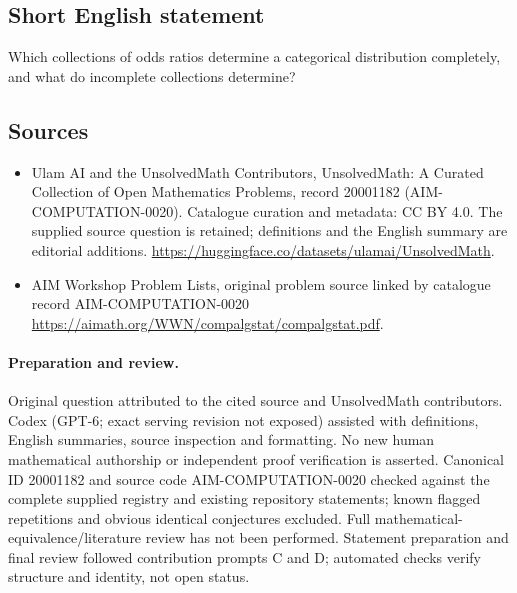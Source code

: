\documentclass[11pt]{article}
\begin{document}
\subsection{Short English statement}
Which collections of odds ratios determine a categorical distribution completely, and what do incomplete collections determine?
\subsection{Sources}
\begin{itemize}
\item[\hypertarget{source:20001182:1}{S1}] Ulam AI and the UnsolvedMath Contributors, UnsolvedMath: A Curated Collection of Open Mathematics Problems, record 20001182 (AIM-COMPUTATION-0020). Catalogue curation and metadata: CC BY 4.0. The supplied source question is retained; definitions and the English summary are editorial additions.
\url{https://huggingface.co/datasets/ulamai/UnsolvedMath}.
\item[\hypertarget{source:20001182:2}{S2}] AIM Workshop Problem Lists, original problem source linked by catalogue record AIM-COMPUTATION-0020
\url{https://aimath.org/WWN/compalgstat/compalgstat.pdf}.
\end{itemize}
\paragraph{Preparation and review.}
Original question attributed to the cited source and UnsolvedMath contributors. Codex (GPT-6; exact serving revision not exposed) assisted with definitions, English summaries, source inspection and formatting. No new human mathematical authorship or independent proof verification is asserted. Canonical ID 20001182 and source code AIM-COMPUTATION-0020 checked against the complete supplied registry and existing repository statements; known flagged repetitions and obvious identical conjectures excluded. Full mathematical-equivalence/literature review has not been performed. Statement preparation and final review followed contribution prompts C and D; automated checks verify structure and identity, not open status.
\label{end:20001182}
\end{document}
